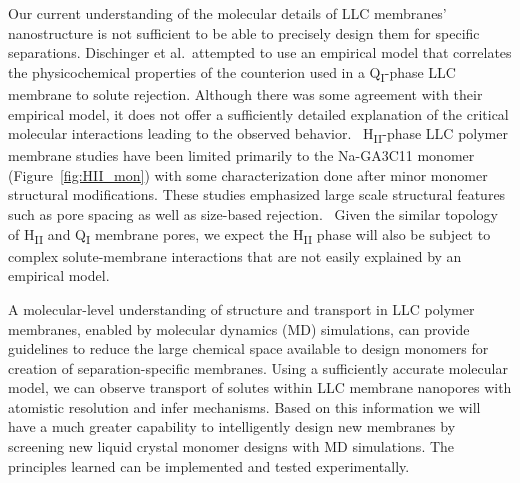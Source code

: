\documentclass{article}
\begin{document}
  Our current understanding of the molecular details of LLC membranes'
  nanostructure is not sufficient to be able to precisely design them for
  specific separations. Dischinger et al.~attempted to use an empirical model
  that correlates the physicochemical properties of the counterion used in
  a Q\textsubscript{I}-phase LLC membrane to solute rejection. Although there
  was some agreement with their empirical model, it does not offer a 
  sufficiently detailed explanation of the critical molecular interactions 
  leading to the observed behavior.~\cite{dischinger_effect_2017} 
  H\textsubscript{II}-phase LLC polymer membrane studies have been limited
  primarily to the Na-GA3C11 monomer (Figure~\ref{fig:HII_mon}) with
  some characterization done after minor monomer structural modifications. 
  These studies emphasized large scale structural features such as pore spacing
  as well as size-based rejection.~\cite{zhou_supported_2005,resel_structural_2000}
  Given the similar topology of H\textsubscript{II} and Q\textsubscript{I}
  membrane pores, we expect the H\textsubscript{II} phase will also be 
  subject to complex solute-membrane interactions that are not easily explained
  by an empirical model.

  A molecular-level understanding of structure and transport in LLC polymer 
  membranes, enabled by molecular dynamics (MD) simulations, can provide 
  guidelines to reduce the large chemical space available to design
  monomers for creation of separation-specific membranes. Using a sufficiently
  accurate molecular model, we can observe transport of solutes within LLC 
  membrane nanopores with atomistic resolution and infer mechanisms. 
  Based on this information we will have a much greater capability to 
  intelligently design new membranes by screening new liquid crystal monomer
  designs with MD simulations. The principles learned can be implemented 
  and tested experimentally.
  
\end{document}
